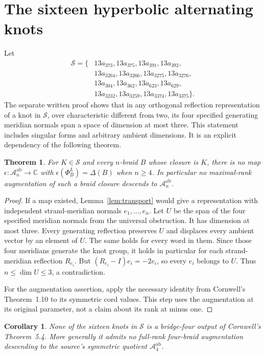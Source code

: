 \documentclass[11pt]{article}
\newtheorem{theorem}[lemma]{Theorem}
\newtheorem{corollary}[lemma]{Corollary}
\newcommand{\C}{\mathbb C}
\begin{document}
\section{The sixteen hyperbolic alternating knots}

Let
\[
\begin{split}
\mathcal S=\{&13a_{373},13a_{375},13a_{391},13a_{392},\\
&13a_{3264},13a_{3266},13a_{3275},13a_{3276},\\
&13a_{304},13a_{362},13a_{623},13a_{629},\\
&13a_{3232},13a_{3259},13a_{3374},13a_{3375}\}.
\end{split}
\]
The separate written proof
 shows that in any
orthogonal reflection representation of a knot in $\mathcal S$,
over characteristic different from two, its four specified
generating meridian normals span a space of dimension at most three.
This statement includes singular forms and arbitrary ambient
dimensions. It is an explicit dependency of the following theorem.

\begin{theorem}\label{thm:exclude}
For $K\in\mathcal S$ and every $n$-braid $B$ whose closure is $K$,
there is no map $\epsilon:\mathcal A_n^{\mathrm{ab}}\to\C$
with $\epsilon(\Phi_B^L)=\Delta(B)$ when $n\ge4$.
In particular no maximal-rank augmentation of such a braid closure
descends to $\mathcal A_n^{\mathrm{ab}}$.
\end{theorem}
\begin{proof}
If a map existed, Lemma~\ref{lem:transport} would give a representation
with independent strand-meridian normals $e_1,\ldots,e_n$.
Let $U$ be the span of the four specified meridian normals from
the universal obstruction. It has dimension at most three.
Every generating reflection preserves $U$ and displaces every
ambient vector by an element of $U$. The same holds for every
word in them. Since those four meridians generate the knot group,
it holds in particular for each strand-meridian reflection $R_{e_i}$.
But $(R_{e_i}-I)e_i=-2e_i$, so every $e_i$ belongs to $U$.
Thus $n\le\dim U\le3$, a contradiction.

For the augmentation assertion, apply the necessary identity from
Cornwell's Theorem~1.10 to its symmetric cord values. This step
uses the augmentation at its original parameter, not a claim about
its rank at minus one.
\end{proof}

\begin{corollary}\label{cor:raising}
None of the sixteen knots in $\mathcal S$ is a bridge-four output of
Cornwell's Theorem~5.4. More generally it admits no full-rank
four-braid augmentation descending to the source's symmetric
quotient $\mathcal A_4^{\mathrm{ab}}$.
\end{corollary}
\end{document}

